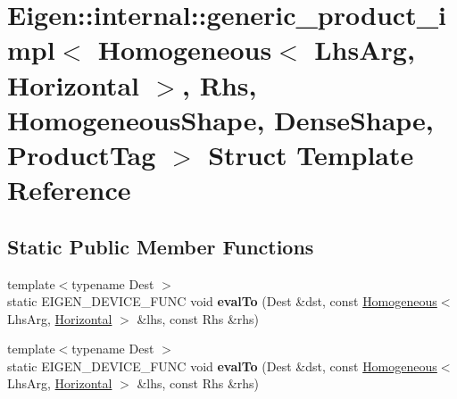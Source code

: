 \hypertarget{struct_eigen_1_1internal_1_1generic__product__impl_3_01_homogeneous_3_01_lhs_arg_00_01_horizontae30a005e4f34a62ed132a21a8e333a29}{}\section{Eigen\+:\+:internal\+:\+:generic\+\_\+product\+\_\+impl$<$ Homogeneous$<$ Lhs\+Arg, Horizontal $>$, Rhs, Homogeneous\+Shape, Dense\+Shape, Product\+Tag $>$ Struct Template Reference}
\label{struct_eigen_1_1internal_1_1generic__product__impl_3_01_homogeneous_3_01_lhs_arg_00_01_horizontae30a005e4f34a62ed132a21a8e333a29}
\subsection*{Static Public Member Functions}
\begin{DoxyCompactItemize}
\item 
\mbox{\label{struct_eigen_1_1internal_1_1generic__product__impl_3_01_homogeneous_3_01_lhs_arg_00_01_horizontae30a005e4f34a62ed132a21a8e333a29_a0cf8dcca7154c8bb3bf1d7395a375092}} 
{\footnotesize template$<$typename Dest $>$ }\\static E\+I\+G\+E\+N\+\_\+\+D\+E\+V\+I\+C\+E\+\_\+\+F\+U\+NC void {\bfseries eval\+To} (Dest \&dst, const \hyperlink{group___geometry___module_class_eigen_1_1_homogeneous}{Homogeneous}$<$ Lhs\+Arg, \hyperlink{group__enums_ggad49a7b3738e273eb00932271b36127f7aae8a16b3b9272683c1162915f6d892be}{Horizontal} $>$ \&lhs, const Rhs \&rhs)
\item 
\mbox{\label{struct_eigen_1_1internal_1_1generic__product__impl_3_01_homogeneous_3_01_lhs_arg_00_01_horizontae30a005e4f34a62ed132a21a8e333a29_a0cf8dcca7154c8bb3bf1d7395a375092}} 
{\footnotesize template$<$typename Dest $>$ }\\static E\+I\+G\+E\+N\+\_\+\+D\+E\+V\+I\+C\+E\+\_\+\+F\+U\+NC void {\bfseries eval\+To} (Dest \&dst, const \hyperlink{group___geometry___module_class_eigen_1_1_homogeneous}{Homogeneous}$<$ Lhs\+Arg, \hyperlink{group__enums_ggad49a7b3738e273eb00932271b36127f7aae8a16b3b9272683c1162915f6d892be}{Horizontal} $>$ \&lhs, const Rhs \&rhs)
\end{DoxyCompactItemize}


